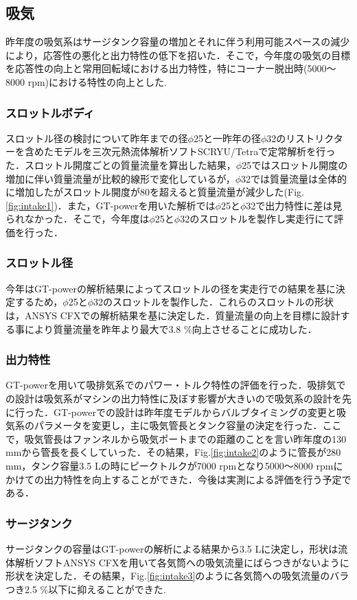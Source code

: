 \subsection{吸気}
昨年度の吸気系はサージタンク容量の増加とそれに伴う利用可能スペースの減少により，応答性の悪化と出力特性の低下を招いた．そこで，今年度の吸気の目標を応答性の向上と常用回転域における出力特性，特にコーナー脱出時(5000〜8000 rpm)における特性の向上とした.

\subsubsection{スロットルボディ}
スロットル径の検討について昨年までの径$\phi$25と一昨年の径$\phi$32のリストリクターを含めたモデルを三次元熱流体解析ソフトSCRYU/Tetraで定常解析を行った．スロットル開度ごとの質量流量を算出した結果，$\phi$25ではスロットル開度の増加に伴い質量流量が比較的線形で変化しているが，$\phi$32では質量流量は全体的に増加したがスロットル開度が80を超えると質量流量が減少した(Fig.\ref{fig:intake1})．また，GT-powerを用いた解析では$\phi$25と$\phi$32で出力特性に差は見られなかった．そこで，今年度は$\phi$25と$\phi$32のスロットルを製作し実走行にて評価を行った．

\subsubsection{スロットル径}
今年はGT-powerの解析結果によってスロットルの径を実走行での結果を基に決定するため，$\phi$25と$\phi$32のスロットルを製作した．これらのスロットルの形状は，ANSYS CFXでの解析結果を基に決定した．質量流量の向上を目標に設計する事により質量流量を昨年より最大で3.8 \%向上させることに成功した．

\subsubsection{出力特性}
GT-powerを用いて吸排気系でのパワー・トルク特性の評価を行った．吸排気での設計は吸気系がマシンの出力特性に及ぼす影響が大きいので吸気系の設計を先に行った．GT-powerでの設計は昨年度モデルからバルブタイミングの変更と吸気系のパラメータを変更し，主に吸気管長とタンク容量の決定を行った．ここで，吸気管長はファンネルから吸気ポートまでの距離のことを言い昨年度の130 mmから管長を長くしていった．その結果，Fig.\ref{fig:intake2}のように管長が280 mm，タンク容量3.5 Lの時にピークトルクが7000 rpmとなり5000〜8000 rpmにかけての出力特性を向上することができた．今後は実測による評価を行う予定である．

\subsubsection{サージタンク}
サージタンクの容量はGT-powerの解析による結果から3.5 Lに決定し，形状は流体解析ソフトANSYS CFXを用いて各気筒への吸気流量にばらつきがないように形状を決定した．その結果，Fig.\ref{fig:intake3}のように各気筒への吸気流量のバラつき2.5 \%以下に抑えることができた.
